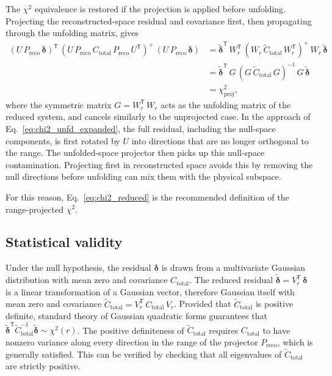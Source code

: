 \documentclass[a4paper,11pt]{article}
\begin{document}
The $\chi^{2}$ equivalence is restored if the projection is applied before unfolding. Projecting the reconstructed-space residual and covariance first, then propagating through the unfolding matrix, gives
\begin{equation}\label{eq:chi2_proj_then_unf}
    \begin{split}
        (U \, P_{\text{reco}} \, \boldsymbol{\delta})^{\mathsf{T}} \, (U \, P_{\text{reco}} \, C_{\text{total}} \, P_{\text{reco}} \, U^{\mathsf{T}})^{+} \, (U \, P_{\text{reco}} \, \boldsymbol{\delta}) &= \tilde{\boldsymbol{\delta}}^{\mathsf{T}} \, W_{r}^{\mathsf{T}} \, (W_{r} \, \tilde{C}_{\text{total}} \, W_{r}^{\mathsf{T}})^{+} \, W_{r} \, \tilde{\boldsymbol{\delta}}\\
        &= \tilde{\boldsymbol{\delta}}^{\mathsf{T}} \, G \, (G \, \tilde{C}_{\text{total}} \, G)^{-1} \, G \, \tilde{\boldsymbol{\delta}}\\
        &= \chi^2_{\text{proj}},
    \end{split}
\end{equation}
where the symmetric matrix $G = W_{r}^{\mathsf{T}} \, W_{r}$ acts as the unfolding matrix of the reduced system, and cancels similarly to the unprojected case. In the approach of Eq.~\eqref{eq:chi2_unfd_expanded}, the full residual, including the null-space components, is first rotated by $U$ into directions that are no longer orthogonal to the range. The unfolded-space projector then picks up this null-space contamination. Projecting first in reconstructed space avoids this by removing the null directions before unfolding can mix them with the physical subspace.

For this reason, Eq.~\eqref{eq:chi2_reduced} is the recommended definition of the range-projected $\chi^2$.

\subsection{Statistical validity}
\label{subsec:validity}

Under the null hypothesis, the residual $\boldsymbol{\delta}$ is drawn from a multivariate Gaussian distribution with mean zero and covariance $C_{\text{total}}$. The reduced residual $\tilde{\boldsymbol{\delta}} = V_r^{\mathsf{T}} \, \boldsymbol{\delta}$ is a linear transformation of a Gaussian vector, therefore Gaussian itself with mean zero and covariance $\tilde{C}_{\text{total}} = V_r^{\mathsf{T}} \, C_{\text{total}} \, V_r$. Provided that $\tilde{C}_{\text{total}}$ is positive definite, standard theory of Gaussian quadratic forms guarantees that $\tilde{\boldsymbol{\delta}}^{\mathsf{T}} \tilde{C}_{\text{total}}^{-1} \tilde{\boldsymbol{\delta}} \sim \chi^2(r)$. The positive definiteness of $\tilde{C}_{\text{total}}$ requires $C_{\text{total}}$ to have nonzero variance along every direction in the range of the projector $P_{\text{reco}}$, which is generally satisfied. This can be verified by checking that all eigenvalues of $\tilde{C}_{\text{total}}$ are strictly positive.
\end{document}
